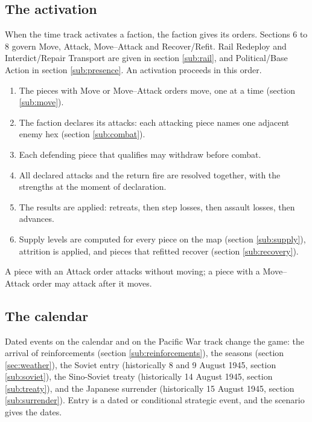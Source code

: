 \documentclass[11pt]{article}
\begin{document}
\subsection{The activation}\label{sub:activations}
When the time track activates a faction, the faction gives its orders. Sections 6 to 8 govern Move, Attack, Move--Attack and Recover/Refit. Rail Redeploy and Interdict/Repair Transport are given in section \ref{sub:rail}, and Political/Base Action in section \ref{sub:presence}. An activation proceeds in this order.
\begin{enumerate}
\item The pieces with Move or Move--Attack orders move, one at a time (section \ref{sub:move}).
\item The faction declares its attacks: each attacking piece names one adjacent enemy hex (section \ref{sub:combat}).
\item Each defending piece that qualifies may withdraw before combat.
\item All declared attacks and the return fire are resolved together, with the strengths at the moment of declaration.
\item The results are applied: retreats, then step losses, then assault losses, then advances.
\item Supply levels are computed for every piece on the map (section \ref{sub:supply}), attrition is applied, and pieces that refitted recover (section \ref{sub:recovery}).
\end{enumerate}
A piece with an Attack order attacks without moving; a piece with a Move--Attack order may attack after it moves.

\subsection{The calendar}\label{sub:calendar}
Dated events on the calendar and on the Pacific War track change the game: the arrival of reinforcements (section \ref{sub:reinforcements}), the seasons (section \ref{sec:weather}), the Soviet entry (historically 8 and 9 August 1945, section \ref{sub:soviet}), the Sino-Soviet treaty (historically 14 August 1945, section \ref{sub:treaty}), and the Japanese surrender (historically 15 August 1945, section \ref{sub:surrender}). Entry is a dated or conditional strategic event, and the scenario gives the dates.

\end{document}
